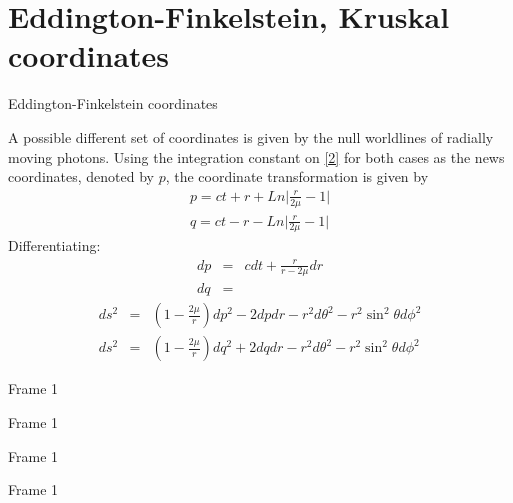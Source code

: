 \documentclass[xcolor=dvipsnames]{beamer}
\begin{document}
\section{Eddington-Finkelstein, Kruskal coordinates}
\begin{frame}{Eddington-Finkelstein coordinates}


A possible different set of coordinates is given by the null worldlines of radially moving photons. Using the integration constant on \ref{2} for both cases as the news coordinates, denoted by $p$, the coordinate transformation is given by 
 \begin{eqnarray}
 p= ct + r + Ln\Big| \frac{r}{2\mu}-1 \Big|\label{2}\\
 q= ct - r - Ln\Big| \frac{r}{2\mu}-1 \Big|\label{2}
 \end{eqnarray}
 Differentiating:
 \begin{eqnarray}
       dp&=&cdt +\frac{r}{r-2\mu}dr\\
       dq&=&
 \end{eqnarray}
 \begin{eqnarray}
  	ds^2 &=& \left( 1 - \frac{2\mu}{r}\right)dp^2-2dpdr- r^2 d\theta^2 - r^2 \sin^2 \theta d\phi^2\\
 	ds^2 &=& \left( 1 - \frac{2\mu}{r}\right)dq^2+2dqdr- r^2 d\theta^2 - r^2 \sin^2 \theta d\phi^2
 \end{eqnarray}
 
 
 
 
 
\end{frame}

\begin{frame}{Frame 1}

\end{frame}




\begin{frame}{Frame 1}

\end{frame}



\begin{frame}{Frame 1}

\end{frame}



\begin{frame}{Frame 1}

\end{frame}
\end{document}
